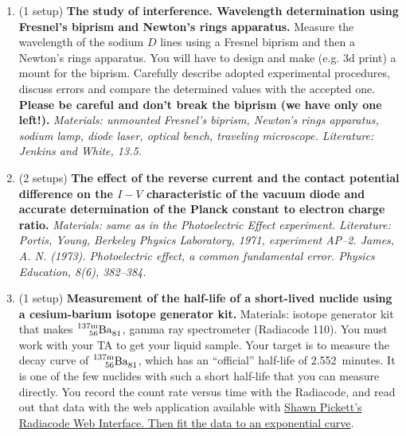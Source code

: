 \documentclass[12pt]{article}
\def\elem#1#2#3#4#5{{%
   \phantom{{}^{#2}_{#3}}%
   {\vphantom{\rm#1}}^{\llapscr{#2}}_{\llapscr{#3}}%
   {\rm#1}^{#4}_{#5}%
}}
\def\llapscr#1{\llap{$\scriptstyle#1$}}
\begin{document}
\begin{enumerate}
    \item (1 setup) \textbf{The study of interference. Wavelength determination using Fresnel's biprism and Newton's rings apparatus.} Measure the wavelength of the sodium $D$ lines using a Fresnel biprism and then a Newton's rings apparatus. You will have to design and make (e.g. 3d print) a mount for the biprism. Carefully describe adopted experimental procedures, discuss errors and compare the determined values with the accepted one. \textbf{Please be careful and don't break the biprism (we have only one left!).} \textit{Materials: unmounted Fresnel's biprism, Newton's rings apparatus, sodium lamp, diode laser, optical bench, traveling microscope. Literature: Jenkins and White, 13.5.}
    \item (2 setups) \textbf{The effect of the reverse current and the contact potential difference on the $I-V$ characteristic of the vacuum diode and accurate determination of the Planck constant to electron charge ratio.}  
    \textit{Materials: same as in the Photoelectric Effect experiment. Literature: Portis, Young, Berkeley Physics Laboratory, 1971, experiment AP--2. James, A. N. (1973). Photoelectric effect, a common fundamental error. Physics Education, 8(6), 382--384.}%
    \item (1 setup) \textbf{Measurement of the half-life of a short-lived nuclide using a cesium-barium isotope generator kit.} Materials: isotope generator kit that makes $\elem{Ba}{137\text{m}}{56}{}{81}$, gamma ray spectrometer (Radiacode 110). You must work with your TA to get your liquid sample.  Your target is to measure the decay curve of $\elem{Ba}{137\text{m}}{56}{}{81}$, which has an ``official'' half-life of 2.552~minutes. It is one of the few nuclides with such a short half-life that you can measure directly.  You record the count rate versus time with the Radiacode, and read out that data with the web application available with \href{https://www.shawnpickett.tech/radiation-detectors/radiacode}{Shawn Pickett's Radiacode Web Interface.  Then fit the data to an exponential curve}.
    

\end{enumerate}
\end{document}
